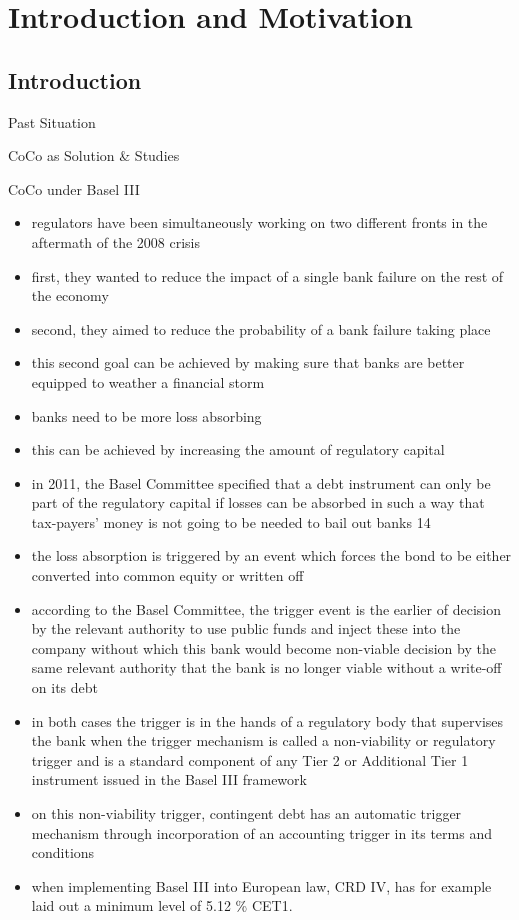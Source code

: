 \chapter{Introduction and Motivation}

\section{Introduction}

Past Situation

CoCo as Solution & Studies

CoCo under Basel III

\begin{itemize}
\item regulators have been simultaneously working on two different fronts in the aftermath of the 2008 crisis
\item first, they wanted to reduce the impact of a single bank failure on the rest of the economy
\item second, they aimed to reduce the probability of a bank failure taking place
\item this second goal can be achieved by making sure that banks are better equipped to weather a financial storm
\item banks need to be more loss absorbing
\item this can be achieved by increasing the amount of regulatory capital 
\end{itemize}

\begin{itemize}
\item in 2011, the Basel Committee specified that a debt instrument can only be part of the regulatory capital if losses can be absorbed in such a way that tax-payers' money is not going to be needed to bail out banks {14}
\item the loss absorption is triggered by an event which forces the bond to be either converted into common equity or written off
\item according to the Basel Committee, the trigger event is the earlier of
\subitem decision by the relevant authority to use public funds and inject these into the company without which this bank would become non-viable
\subitem decision by the same relevant authority that the bank is no longer viable without a write-off on its debt
\item in both cases the trigger is in the hands of a regulatory body that supervises the bank when the trigger mechanism is called a non-viability or regulatory trigger and is a standard component of any Tier 2 or Additional Tier 1 instrument issued in the Basel III framework
\item on this non-viability trigger, contingent debt has an automatic trigger mechanism through incorporation of an accounting trigger in its terms and conditions
\item when implementing Basel III into European law, CRD IV, has for example laid out a minimum level of 5.12 \% CET1.
\end{itemize}

